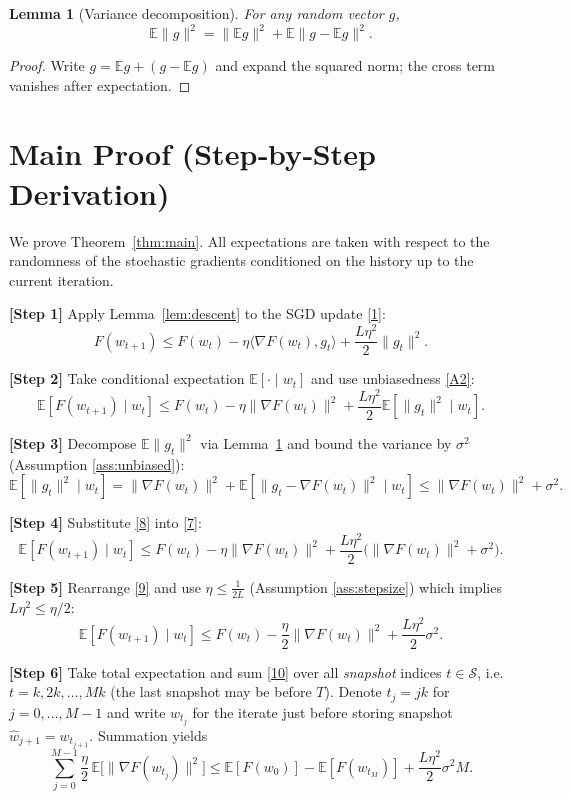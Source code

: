 \documentclass{article}
\newtheorem{lemma}{Lemma}
\begin{document}
\begin{lemma}[Variance decomposition]\label{lem:var}
For any random vector $g$,
\[
\mathbb{E}\|g\|^{2}= \|\mathbb{E}g\|^{2}+ \mathbb{E}\|g-\mathbb{E}g\|^{2}.
\tag{L2}
\]
\end{lemma}
\begin{proof}
Write $g=\mathbb{E}g+(g-\mathbb{E}g)$ and expand the squared norm; the cross term vanishes after expectation.
\end{proof}

\section*{Main Proof (Step‑by‑Step Derivation)}
We prove Theorem~\ref{thm:main}.  
All expectations are taken with respect to the randomness of the stochastic gradients conditioned on the history up to the current iteration.

\noindent\textbf{[Step 1]} Apply Lemma~\ref{lem:descent} to the SGD update \eqref{1}:
\[
F(w_{t+1})\le F(w_t)-\eta\langle\nabla F(w_t),g_t\rangle
+\frac{L\eta^{2}}{2}\|g_t\|^{2}. \tag{6}
\]

\noindent\textbf{[Step 2]} Take conditional expectation $\mathbb{E}[\cdot\mid w_t]$ and use unbiasedness \eqref{A2}:
\[
\mathbb{E}\!\left[F(w_{t+1})\mid w_t\right]
\le F(w_t)-\eta\|\nabla F(w_t)\|^{2}
+\frac{L\eta^{2}}{2}\mathbb{E}\!\left[\|g_t\|^{2}\mid w_t\right].
\tag{7}
\]

\noindent\textbf{[Step 3]} Decompose $\mathbb{E}\|g_t\|^{2}$ via Lemma~\ref{lem:var} and bound the variance by $\sigma^{2}$ (Assumption \ref{ass:unbiased}):
\[
\mathbb{E}\!\left[\|g_t\|^{2}\mid w_t\right]
= \|\nabla F(w_t)\|^{2}+ \mathbb{E}\!\left[\|g_t-\nabla F(w_t)\|^{2}\mid w_t\right]
\le \|\nabla F(w_t)\|^{2}+ \sigma^{2}.
\tag{8}
\]

\noindent\textbf{[Step 4]} Substitute \eqref{8} into \eqref{7}:
\[
\mathbb{E}\!\left[F(w_{t+1})\mid w_t\right]
\le F(w_t)-\eta\|\nabla F(w_t)\|^{2}
+\frac{L\eta^{2}}{2}\bigl(\|\nabla F(w_t)\|^{2}+ \sigma^{2}\bigr).
\tag{9}
\]

\noindent\textbf{[Step 5]} Rearrange \eqref{9} and use $\eta\le\frac{1}{2L}$ (Assumption \ref{ass:stepsize}) which implies $L\eta^{2}\le\eta/2$:
\[
\mathbb{E}\!\left[F(w_{t+1})\mid w_t\right]
\le F(w_t)-\frac{\eta}{2}\|\nabla F(w_t)\|^{2}
+\frac{L\eta^{2}}{2}\sigma^{2}.
\tag{10}
\]

\noindent\textbf{[Step 6]} Take total expectation and sum \eqref{10} over all \emph{snapshot} indices $t\in\mathcal{S}$, i.e. $t=k,2k,\dots,Mk$ (the last snapshot may be before $T$).  
Denote $t_j=jk$ for $j=0,\dots,M-1$ and write $w_{t_j}$ for the iterate just before storing snapshot $\widehat w_{j+1}=w_{t_{j+1}}$.
Summation yields
\[
\sum_{j=0}^{M-1}\frac{\eta}{2}\,\mathbb{E}\!\big[\|\nabla F(w_{t_j})\|^{2}\big]
\le \mathbb{E}[F(w_{0})]-\mathbb{E}[F(w_{t_{M}})]
+ \frac{L\eta^{2}}{2}\sigma^{2}M .
\tag{11}
\]
\end{document}
